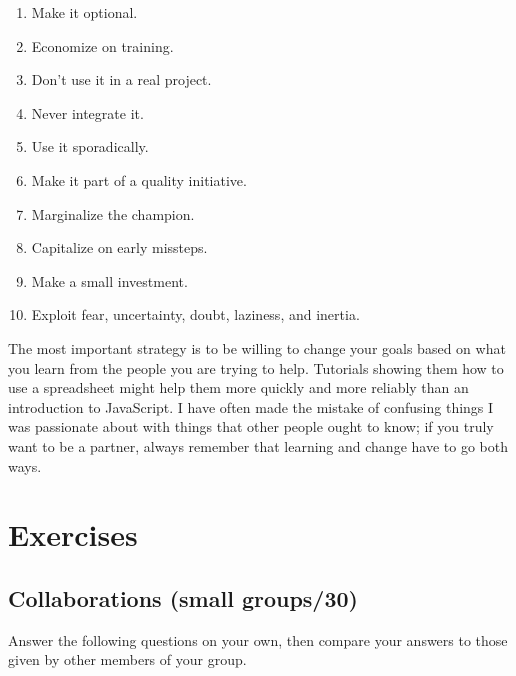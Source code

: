 \begin{enumerate}

\item
  Make it optional.

\item
  Economize on training.

\item
  Don't use it in a real project.

\item
  Never integrate it.

\item
  Use it sporadically.

\item
  Make it part of a quality initiative.

\item
  Marginalize the champion.

\item
  Capitalize on early missteps.

\item
  Make a small investment.

\item
  Exploit fear, uncertainty, doubt, laziness, and inertia.

\end{enumerate}

The most important strategy is
to be willing to change your goals
based on what you learn from the people you are trying to help.
Tutorials showing them how to use a spreadsheet
might help them more quickly and more reliably than
an introduction to JavaScript.
I have often made the mistake of confusing things I was passionate about
with things that other people ought to know;
if you truly want to be a partner,
always remember that learning and change have to go both ways.

\section{Exercises}\label{s:partner-exercises}

\subsection*{Collaborations (small groups/30)}

Answer the following questions on your own,
then compare your answers to those given by other members of your group.

